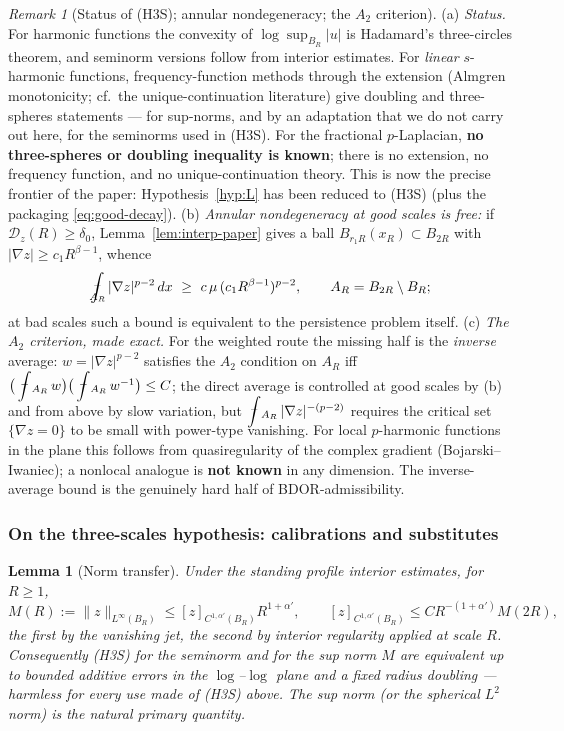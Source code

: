 \documentclass[11pt]{amsart}
\theoremstyle{plain}
\newtheorem{lemma}[theorem]{Lemma}
\theoremstyle{definition}
\theoremstyle{remark}
\newtheorem{remark}[theorem]{Remark}
\newcommand{\al}{\alpha}
\newcommand{\fint}{\mathop{\ooalign{$\displaystyle\int$\cr\hidewidth\raise.5ex\hbox{$\scriptstyle-$}\hidewidth}}}
\begin{document}
\begin{remark}[Status of \textnormal{(H3S)}; annular nondegeneracy; the
$A_2$ criterion]\label{rem:H3S-status}
\textnormal{(a)} \emph{Status.} For harmonic functions the convexity of
$\log\sup_{B_R}|u|$ is Hadamard's three-circles theorem, and seminorm
versions follow from interior estimates. For \emph{linear} $s$-harmonic
functions, frequency-function methods through the extension
\textnormal{(}Almgren monotonicity; cf.\ the unique-continuation
literature\textnormal{)} give doubling and three-spheres statements ---
for sup-norms, and by an adaptation that we do not carry out here, for the
seminorms used in \textnormal{(H3S)}. For the fractional $p$-Laplacian,
\textbf{no three-spheres or doubling inequality is known}; there is no
extension, no frequency function, and no unique-continuation theory. This
is now the precise frontier of the paper: Hypothesis~\ref{hyp:L} has been
reduced to \textnormal{(H3S)} \textnormal{(}plus the packaging
\eqref{eq:good-decay}\textnormal{)}.
\textnormal{(b)} \emph{Annular nondegeneracy at good scales is free:} if
$\mathcal D_z(R)\ge\delta_0$, Lemma~\ref{lem:interp-paper} gives a ball
$B_{r_1R}(x_R)\subset B_{2R}$ with $|\nabla z|\ge c_1R^{\beta-1}$, whence
\[
  \fint_{A_R}|\nabla z|^{p-2}\,dx\ \ge\ c\,\mu\,(c_1R^{\beta-1})^{p-2},
  \qquad A_R=B_{2R}\setminus B_R ;
\]
at bad scales such a bound is equivalent to the persistence problem
itself.
\textnormal{(c)} \emph{The $A_2$ criterion, made exact.} For the weighted
route the missing half is the \emph{inverse} average: $w=|\nabla z|^{p-2}$
satisfies the $A_2$ condition on $A_R$ iff
$\big(\fint_{A_R}w\big)\big(\fint_{A_R}w^{-1}\big)\le C$; the direct
average is controlled at good scales by (b) and from above by slow
variation, but $\fint_{A_R}|\nabla z|^{-(p-2)}$ requires the critical set
$\{\nabla z=0\}$ to be small with power-type vanishing. For local
$p$-harmonic functions in the plane this follows from quasiregularity of
the complex gradient \textnormal{(}Bojarski--Iwaniec\textnormal{)}; a
nonlocal analogue is \textbf{not known} in any dimension. The
inverse-average bound is the genuinely hard half of BDOR-admissibility.
\end{remark}

\subsubsection*{On the three-scales hypothesis: calibrations and substitutes}

\begin{lemma}[Norm transfer]\label{lem:normtransfer}
Under the standing profile interior estimates, for $R\ge1$,
\[
  M(R):=\|z\|_{L^\infty(B_R)}\le [z]_{C^{1,\al'}(B_R)}R^{1+\al'},
  \qquad
  [z]_{C^{1,\al'}(B_R)}\le C R^{-(1+\al')}M(2R),
\]
the first by the vanishing jet, the second by interior regularity applied
at scale $R$. Consequently \textnormal{(H3S)} for the seminorm and for the
sup norm $M$ are equivalent up to bounded additive errors in the
$\log$--$\log$ plane and a fixed radius doubling --- harmless for every use
made of \textnormal{(H3S)} above. The sup norm \textnormal{(}or the
spherical $L^2$ norm\textnormal{)} is the natural primary quantity.
\end{lemma}
\end{document}
